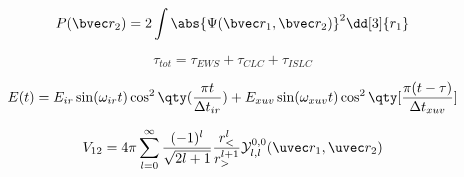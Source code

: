 \begin{equation}
P(\bvec r_2) = 2\int \abs{\Psi(\bvec r_1, \bvec r_2)}^2 \dd[3]{r_1}
\end{equation}

\begin{equation}
\tau_{tot} = \tau_{EWS} + \tau_{CLC} + \tau_{ISLC}
\end{equation}


\begin{equation}
E(t) = E_{ir} \sin(\omega_{ir} t) \cos^2\qty(\frac{\pi t}{\Delta t_{ir}})
+ E_{xuv} \sin(\omega_{xuv} t) \cos^2\qty[\frac{\pi(t-\tau)}{\Delta t_{xuv}}]
\end{equation}

\begin{equation}
V_{12} = 4\pi \sum_{l=0}^{\infty} \frac{(-1)^l}{\sqrt{2l + 1}} \frac{r_<^l}{r_>^{l+1}} \mathcal{Y}_{l,l}^{0,0} (\uvec r_1, \uvec r_2)
\end{equation}
